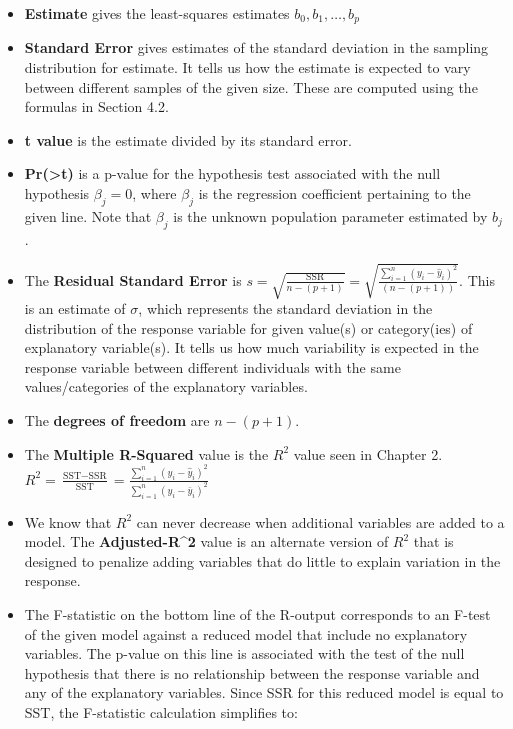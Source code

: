 \documentclass[
  letterpaper,
  DIV=11,
  numbers=noendperiod]{scrreprt}
\begin{document}
\begin{itemize}
\item
  \textbf{Estimate} gives the least-squares estimates
  \(b_0, b_1, \ldots, b_p\)
\item
  \textbf{Standard Error} gives estimates of the standard deviation in
  the sampling distribution for estimate. It tells us how the estimate
  is expected to vary between different samples of the given size. These
  are computed using the formulas in Section 4.2.
\item
  \textbf{t value} is the estimate divided by its standard error.
\item
  \textbf{Pr(\textgreater\textbar t\textbar)} is a p-value for the
  hypothesis test associated with the null hypothesis \(\beta_j = 0\),
  where \(\beta_j\) is the regression coefficient pertaining to the
  given line. Note that \(\beta_j\) is the unknown population parameter
  estimated by \(b_j\).
\item
  The \textbf{Residual Standard Error} is
  \(s =\sqrt{\frac{\text{SSR}}{n-(p+1)}} = \sqrt{\frac{\displaystyle\sum_{i=1}^n(y_i-\hat{y}_i)^2}{(n-(p+1))}}\).
  This is an estimate of \(\sigma\), which represents the standard
  deviation in the distribution of the response variable for given
  value(s) or category(ies) of explanatory variable(s). It tells us how
  much variability is expected in the response variable between
  different individuals with the same values/categories of the
  explanatory variables.
\item
  The \textbf{degrees of freedom} are \(n-(p+1)\).
\item
  The \textbf{Multiple R-Squared} value is the \(R^2\) value seen in
  Chapter 2.
  \(R^2 = \frac{\text{SST} -\text{SSR}}{\text{SST}} = \frac{\displaystyle\sum_{i=1}^n(y_i-\hat{y}_i)^2}{\displaystyle\sum_{i=1}^n(y_i-\bar{y}_i)^2}\)
\item
  We know that \(R^2\) can never decrease when additional variables are
  added to a model. The \textbf{Adjusted-R\^{}2} value is an alternate
  version of \(R^2\) that is designed to penalize adding variables that
  do little to explain variation in the response.
\item
  The F-statistic on the bottom line of the R-output corresponds to an
  F-test of the given model against a reduced model that include no
  explanatory variables. The p-value on this line is associated with the
  test of the null hypothesis that there is no relationship between the
  response variable and any of the explanatory variables. Since SSR for
  this reduced model is equal to SST, the F-statistic calculation
  simplifies to:
\end{itemize}
\end{document}
